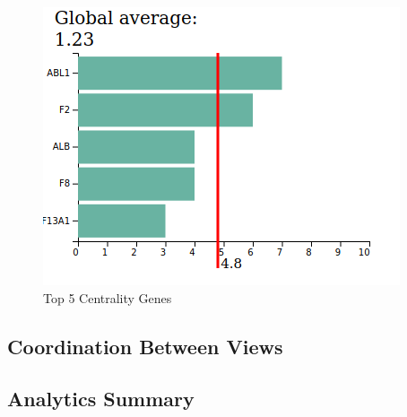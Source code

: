 \documentclass[12pt,twocolumn,twoside]{article}
\begin{document}
\begin{figure}
	\includegraphics[width=.95\linewidth]{top5.png}
	\caption{Top 5 Centrality Genes}
	\label{top5}
\end{figure}

\subsection*{Coordination Between Views}


\subsection*{Analytics Summary}

\clearpage

 
\end{document}
